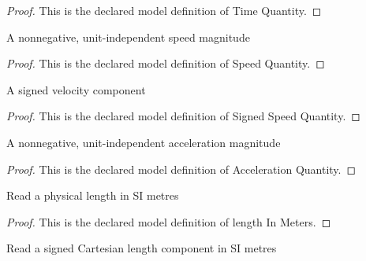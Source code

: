 \begin{proof}
  This is the declared model definition of Time Quantity.
\end{proof}
\begin{definition}
  \label{def:physics:phyx-mini-0742:phyxminiproblems-problemphyxmini0742-speedquantity}
  A nonnegative, unit-independent speed magnitude
\end{definition}
\begin{proof}
  This is the declared model definition of Speed Quantity.
\end{proof}
\begin{definition}
  \label{def:physics:phyx-mini-0742:phyxminiproblems-problemphyxmini0742-signedspeedquantity}
  A signed velocity component
\end{definition}
\begin{proof}
  This is the declared model definition of Signed Speed Quantity.
\end{proof}
\begin{definition}
  \label{def:physics:phyx-mini-0742:phyxminiproblems-problemphyxmini0742-accelerationquantity}
  A nonnegative, unit-independent acceleration magnitude
\end{definition}
\begin{proof}
  This is the declared model definition of Acceleration Quantity.
\end{proof}
\begin{definition}
  \label{def:physics:phyx-mini-0742:phyxminiproblems-problemphyxmini0742-lengthinmeters}
  Read a physical length in SI metres
\end{definition}
\begin{proof}
  This is the declared model definition of length In Meters.
\end{proof}
\begin{definition}
  \label{def:physics:phyx-mini-0742:phyxminiproblems-problemphyxmini0742-signedlengthinmeters}
  Read a signed Cartesian length component in SI metres
\end{definition}
